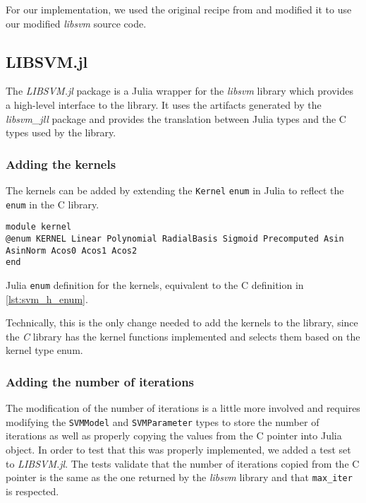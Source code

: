 For our implementation, we used the original recipe from
\textcite{LibsvmJllJl2022} and modified it to use our modified \emph{libsvm}
source code.

\subsection{LIBSVM.jl}

The \emph{LIBSVM.jl} package \cite{LIBSVMJl2023} is a Julia wrapper for the
\emph{libsvm} library which provides a high-level interface to the library. It
uses the artifacts generated by the \emph{libsvm\_jll} package and provides the
translation between Julia types and the C types used by the library.

\subsubsection{Adding the kernels}

The kernels can be added by extending the \texttt{Kernel} \texttt{enum} in Julia
to reflect the \texttt{enum} in the C library.
\begin{listing}[H]
    \begin{verbatim}
module kernel
@enum KERNEL Linear Polynomial RadialBasis Sigmoid Precomputed Asin AsinNorm Acos0 Acos1 Acos2
end
\end{verbatim}
    \caption{Julia \texttt{enum} definition for the kernels, equivalent to the C definition in \cref{lst:svm_h_enum}.}
    \label{lst:kernel_enum_julia}
\end{listing}

Technically, this is the only change needed to add the kernels to the library,
since the \emph{C} library has the kernel functions implemented and selects them
based on the kernel type enum.

\subsubsection{Adding the number of iterations}

The modification of the number of iterations is a little more involved and
requires modifying the \texttt{SVMModel} and \texttt{SVMParameter} types to
store the number of iterations as well as properly copying the values from the C
pointer into Julia object. In order to test that this was properly implemented,
we added a test set to \emph{LIBSVM.jl}. The tests validate that the number of
iterations copied from the C pointer is the same as the one returned by the
\emph{libsvm} library and that \texttt{max\_iter} is respected.


